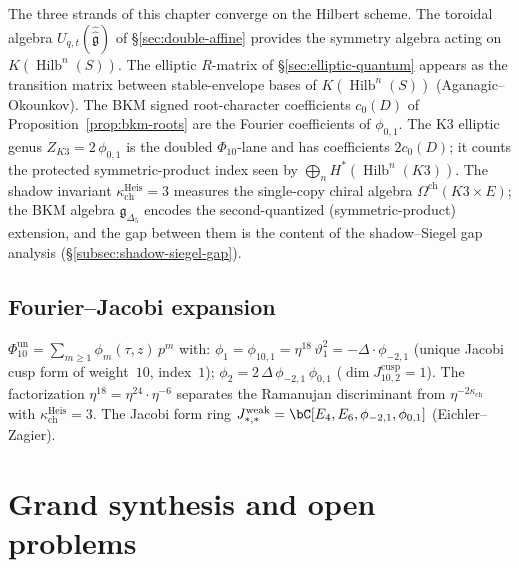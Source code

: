 \begin{remark}
\label{rem:bridge-synthesis}
The three strands of this chapter converge on the Hilbert scheme.
The toroidal algebra $U_{q,t}(\hat{\hat{\mathfrak{g}}})$ of
\S\ref{sec:double-affine} provides the symmetry algebra
acting on $K(\operatorname{Hilb}^n(S))$.
The elliptic $R$-matrix of
\S\ref{sec:elliptic-quantum} appears as the transition
matrix between stable-envelope bases of $K(\operatorname{Hilb}^n(S))$
(Aganagic--Okounkov).
The BKM signed root-character coefficients $c_0(D)$ of
Proposition~\ref{prop:bkm-roots} are the Fourier coefficients of
\(\phi_{0,1}\). The K3 elliptic genus
\(Z_{K3}=2\,\phi_{0,1}\) is the doubled \(\Phi_{10}\)-lane and has
coefficients \(2c_0(D)\); it counts the protected symmetric-product
index seen by
$\bigoplus_n H^*(\operatorname{Hilb}^n(K3))$.
The shadow invariant $\kappa_{\mathrm{ch}}^{\mathrm{Heis}} = 3$ measures the single-copy
chiral algebra $\Omega^{\mathrm{ch}}(K3 \times E)$; the BKM algebra
$\mathfrak{g}_{\Delta_5}$ encodes the second-quantized
(symmetric-product) extension, and the gap between them is the content
of the shadow--Siegel gap analysis
(\S\ref{subsec:shadow-siegel-gap}).
\end{remark}


\subsection{Fourier--Jacobi expansion}
\label{subsec:fj-expansion}

\begin{remark}
\label{rem:fj-structure}
\(\Phi_{10}^{\mathrm{un}} = \sum_{m \geq 1} \phi_m(\tau,z)\,p^m\) with:
$\phi_1 = \phi_{10,1} = \eta^{18}\,\vartheta_1^2 =
-\Delta \cdot \phi_{-2,1}$
(unique Jacobi cusp form of weight~$10$, index~$1$);
$\phi_2 = 2\,\Delta\,\phi_{-2,1}\,\phi_{0,1}$
($\dim J_{10,2}^{\mathrm{cusp}} = 1$).
The factorization $\eta^{18} = \eta^{24} \cdot \eta^{-6}$
separates the Ramanujan discriminant from
$\eta^{-2\kappa_{\mathrm{ch}}}$ with $\kappa_{\mathrm{ch}}^{\mathrm{Heis}} = 3$. The Jacobi form ring
$J_{*,*}^{\mathrm{weak}} = \bC[E_4, E_6, \phi_{-2,1},
\phi_{0,1}]$ (Eichler--Zagier).
\end{remark}



\section{Grand synthesis and open problems}
\label{sec:grand-synthesis-k3xe}

